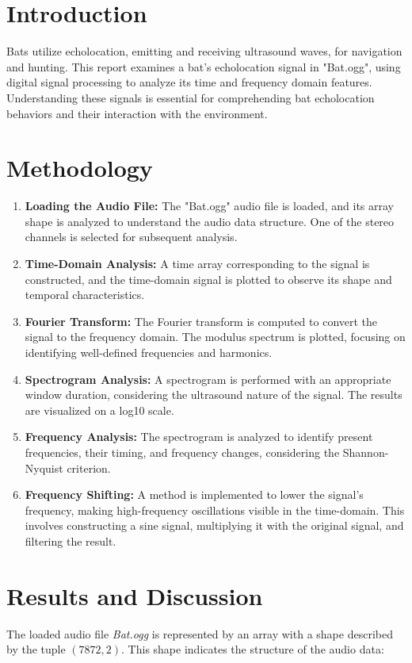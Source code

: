 \documentclass{article}
\begin{document}
\begin{multicols}{2}
\section{Introduction}
    Bats utilize echolocation, emitting and receiving ultrasound waves, for navigation and hunting. This report examines a bat's echolocation signal in "Bat.ogg", using digital signal processing to analyze its time and frequency domain features. Understanding these signals is essential for comprehending bat echolocation behaviors and their interaction with the environment.
    
\section{Methodology}
\begin{enumerate}
    \item \textbf{Loading the Audio File:} The "Bat.ogg" audio file is loaded, and its array shape is analyzed to understand the audio data structure. One of the stereo channels is selected for subsequent analysis.
    \item \textbf{Time-Domain Analysis:} A time array corresponding to the signal is constructed, and the time-domain signal is plotted to observe its shape and temporal characteristics.
    \item \textbf{Fourier Transform:} The Fourier transform is computed to convert the signal to the frequency domain. The modulus spectrum is plotted, focusing on identifying well-defined frequencies and harmonics.
    \item \textbf{Spectrogram Analysis:} A spectrogram is performed with an appropriate window duration, considering the ultrasound nature of the signal. The results are visualized on a log10 scale.
    \item \textbf{Frequency Analysis:} The spectrogram is analyzed to identify present frequencies, their timing, and frequency changes, considering the Shannon-Nyquist criterion.
    \item \textbf{Frequency Shifting:} A method is implemented to lower the signal's frequency, making high-frequency oscillations visible in the time-domain. This involves constructing a sine signal, multiplying it with the original signal, and filtering the result.
\end{enumerate}
\section{Results and Discussion}
The loaded audio file \textit{Bat.ogg} is represented by an array with a shape described by the tuple $(7872, 2)$. This shape indicates the structure of the audio data:


\end{multicols}
\end{document}
